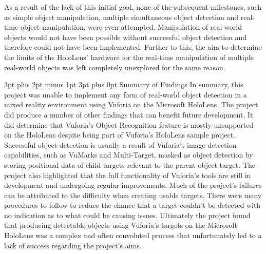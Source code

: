 \documentclass[12pt,a4paper,oneside]{article}
\makeatletter
\renewcommand\subsubsection{\@startsection {subsubsection}{1}{0mm} %
	                           {3pt plus 2pt minus 1pt} %
	                           {3pt plus 0pt} %
	                           {\normalfont\bfseries}}
\makeatother
\begin{document}
As a result of the lack of this initial goal, none of the subsequent milestones, such as simple object manipulation, multiple simultaneous object detection and real-time object manipulation, were even attempted. Manipulation of real-world objects would not have been possible without successful object detection and therefore could not have been implemented. Further to this, the aim to determine the limits of the HoloLens' hardware for the real-time manipulation of multiple real-world objects was left completely unexplored for the same reason.

\subsubsection{Summary of Findings}
In summary, this project was unable to implement any form of real-world object detection in a mixed reality environment using Vuforia on the Microsoft HoloLens. The project did produce a number of other findings that can benefit future development. It did determine that Vuforia's Object Recognition feature is mostly unsupported on the HoloLens despite being part of Vuforia's HoloLens sample project. Successful object detection is usually a result of Vuforia's image detection capabilities, such as VuMarks and Multi-Target, masked as object detection by storing positional data of child targets relevant to the parent object target. The project also highlighted that the full functionality of Vuforia's tools are still in development and undergoing regular improvements. Much of the project's failures can be attributed to the difficulty when creating usable targets. There were many procedures to follow to reduce the chance that a target couldn't be detected with no indication as to what could be causing issues. Ultimately the project found that producing detectable objects using Vuforia's targets on the Microsoft HoloLens was a complex and often convoluted process that unfortunately led to a lack of success regarding the project's aims.
\end{document}
